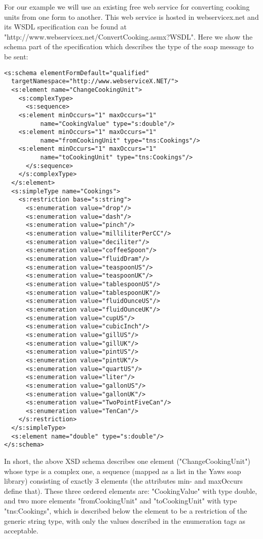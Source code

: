 \documentclass[submission,copyright,a4]{eptcs}
\begin{document}
For our example we will use an existing free web service for converting cooking units from one form to another. This web service is hosted in webservicex.net and its WSDL specification can be found at "http://www.webservicex.net/ConvertCooking.asmx?WSDL". Here we show the schema part of the specification which describes the type of the soap message to be sent:

\begin{lstlisting}
<s:schema elementFormDefault="qualified"
  targetNamespace="http://www.webserviceX.NET/">
  <s:element name="ChangeCookingUnit">
    <s:complexType>
      <s:sequence>
	<s:element minOccurs="1" maxOccurs="1" 
          name="CookingValue" type="s:double"/>
	<s:element minOccurs="1" maxOccurs="1"
          name="fromCookingUnit" type="tns:Cookings"/>
	<s:element minOccurs="1" maxOccurs="1" 
          name="toCookingUnit" type="tns:Cookings"/>
      </s:sequence>
    </s:complexType>
  </s:element>
  <s:simpleType name="Cookings">
    <s:restriction base="s:string">
      <s:enumeration value="drop"/>
      <s:enumeration value="dash"/>
      <s:enumeration value="pinch"/>
      <s:enumeration value="milliliterPerCC"/>
      <s:enumeration value="deciliter"/>
      <s:enumeration value="coffeeSpoon"/>
      <s:enumeration value="fluidDram"/>
      <s:enumeration value="teaspoonUS"/>
      <s:enumeration value="teaspoonUK"/>
      <s:enumeration value="tablespoonUS"/>
      <s:enumeration value="tablespoonUK"/>
      <s:enumeration value="fluidOunceUS"/>
      <s:enumeration value="fluidOunceUK"/>
      <s:enumeration value="cupUS"/>
      <s:enumeration value="cubicInch"/>
      <s:enumeration value="gillUS"/>
      <s:enumeration value="gillUK"/>
      <s:enumeration value="pintUS"/>
      <s:enumeration value="pintUK"/>
      <s:enumeration value="quartUS"/>
      <s:enumeration value="liter"/>
      <s:enumeration value="gallonUS"/>
      <s:enumeration value="gallonUK"/>
      <s:enumeration value="TwoPointFiveCan"/>
      <s:enumeration value="TenCan"/>
    </s:restriction>
  </s:simpleType>
  <s:element name="double" type="s:double"/>
</s:schema>

\end{lstlisting}

In short, the above XSD schema describes one element ("ChangeCookingUnit") whose type is a complex one, a sequence (mapped as a list in the Yaws soap library) consisting of exactly 3 elements (the attributes min- and maxOccurs define that). These three ordered elements are: "CookingValue" with type double, and two more elements "fromCookingUnit" and "toCookingUnit" with type "tns:Cookings", which is described below the element to be a restriction of the generic string type, with only the values described in the enumeration tags as acceptable. 
\end{document}
